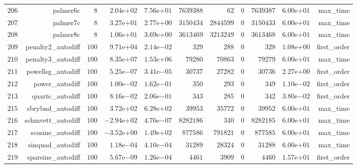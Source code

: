 \documentclass[varwidth=20cm,crop=true]{standalone}
\begin{document}
\begin{longtable}{rrrrrrrrrrr}
  \(   206\) & palmer6c & \(     8\) & \( 2.04\)e\(+02\) & \( 7.56\)e\(+01\) & \(7639388\) & \(    62\) & \(     0\) & \(7639387\) & \( 6.00\)e\(+01\) & max\_time \\
  \(   207\) & palmer7c & \(     8\) & \( 3.27\)e\(+01\) & \( 2.77\)e\(+00\) & \(3150434\) & \(2844599\) & \(     0\) & \(3150433\) & \( 6.00\)e\(+01\) & max\_time \\
  \(   208\) & palmer8c & \(     8\) & \( 1.06\)e\(+01\) & \( 3.69\)e\(+00\) & \(3613469\) & \(3213249\) & \(     0\) & \(3613468\) & \( 6.00\)e\(+01\) & max\_time \\
  \(   209\) & penalty2\_autodiff & \(   100\) & \( 9.71\)e\(+04\) & \( 2.14\)e\(-02\) & \(   329\) & \(   288\) & \(     0\) & \(   328\) & \( 1.08\)e\(+00\) & first\_order \\
  \(   210\) & penalty3\_autodiff & \(   100\) & \( 8.35\)e\(+07\) & \( 1.53\)e\(+06\) & \( 79280\) & \( 70863\) & \(     0\) & \( 79279\) & \( 6.00\)e\(+01\) & max\_time \\
  \(   211\) & powellsg\_autodiff & \(   100\) & \( 5.25\)e\(-07\) & \( 3.41\)e\(-05\) & \( 30737\) & \( 27282\) & \(     0\) & \( 30736\) & \( 2.27\)e\(+00\) & first\_order \\
  \(   212\) & power\_autodiff & \(   100\) & \( 1.00\)e\(-02\) & \( 1.62\)e\(-01\) & \(   350\) & \(   293\) & \(     0\) & \(   349\) & \( 1.10\)e\(-02\) & first\_order \\
  \(   213\) & quartc\_autodiff & \(   100\) & \( 8.16\)e\(-02\) & \( 2.06\)e\(-01\) & \(   343\) & \(   285\) & \(     0\) & \(   342\) & \( 3.80\)e\(-02\) & first\_order \\
  \(   215\) & sbrybnd\_autodiff & \(   100\) & \( 3.72\)e\(+02\) & \( 6.28\)e\(+02\) & \( 39953\) & \( 35772\) & \(     0\) & \( 39952\) & \( 6.00\)e\(+01\) & max\_time \\
  \(   216\) & schmvett\_autodiff & \(   100\) & \(-2.94\)e\(+02\) & \( 4.76\)e\(-07\) & \(8282186\) & \(   340\) & \(     0\) & \(8282185\) & \( 6.00\)e\(+01\) & max\_time \\
  \(   217\) & scosine\_autodiff & \(   100\) & \(-3.52\)e\(+00\) & \( 1.49\)e\(+02\) & \(877586\) & \(791821\) & \(     0\) & \(877585\) & \( 6.00\)e\(+01\) & max\_time \\
  \(   218\) & sinquad\_autodiff & \(   100\) & \( 1.18\)e\(-04\) & \( 4.10\)e\(-04\) & \( 31289\) & \( 28324\) & \(     0\) & \( 31288\) & \( 6.00\)e\(+01\) & max\_time \\
  \(   219\) & sparsine\_autodiff & \(   100\) & \( 5.67\)e\(-09\) & \( 1.26\)e\(-04\) & \(  4461\) & \(  3909\) & \(     0\) & \(  4460\) & \( 1.57\)e\(+01\) & first\_order \\

\end{longtable}
\end{document}
